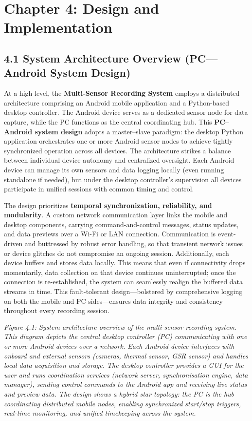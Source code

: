 \label{chap:4} \chapter{Chapter 4: Design and Implementation}

\section{4.1 System Architecture Overview (PC---Android System Design)}

At a high level, the \textbf{Multi-Sensor Recording System} employs a distributed architecture comprising an Android mobile application and a Python-based desktop controller. The Android device serves as a dedicated sensor node for data capture, while the PC functions as the central coordinating hub. This \textbf{PC–Android system design} adopts a master–slave paradigm: the desktop Python application orchestrates one or more Android sensor nodes to achieve tightly synchronized operation across all devices. The architecture strikes a balance between individual device autonomy and centralized oversight. Each Android device can manage its own sensors and data logging locally (even running standalone if needed), but under the desktop controller's supervision all devices participate in unified sessions with common timing and control. 

The design prioritizes \textbf{temporal synchronization, reliability, and modularity}. A custom network communication layer links the mobile and desktop components, carrying command-and-control messages, status updates, and data previews over a Wi-Fi or LAN connection. Communication is event-driven and buttressed by robust error handling, so that transient network issues or device glitches do not compromise an ongoing session. Additionally, each device buffers and stores data locally. This means that even if connectivity drops momentarily, data collection on that device continues uninterrupted; once the connection is re-established, the system can seamlessly realign the buffered data streams in time. This fault-tolerant design—bolstered by comprehensive logging on both the mobile and PC sides—ensures data integrity and consistency throughout every recording session.

\textit{Figure 4.1: System architecture overview of the multi-sensor recording system. This diagram depicts the central desktop controller (PC) communicating with one or more Android devices over a network. Each Android device interfaces with onboard and external sensors (cameras, thermal sensor, GSR sensor) and handles local data acquisition and storage. The desktop controller provides a GUI for the user and runs coordination services (network server, synchronisation engine, data manager), sending control commands to the Android app and receiving live status and preview data. The design shows a hybrid star topology: the PC is the hub coordinating distributed mobile nodes, enabling synchronized start/stop triggers, real-time monitoring, and unified timekeeping across the system.}

